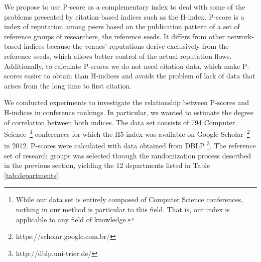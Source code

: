 \documentclass[notitlepage]{svjour3}
\begin{document}
We propose to use P-score as a complementary index to deal with some of the problems
presented by citation-based indices such as the H-index.
P-score is a index of reputation among peers based on the publication pattern of a set of
reference groups of researchers, the reference seeds. It differs from other network-based 
indices because the venues' reputations derive exclusively from the reference seeds, which 
allows better control of the actual reputation flows. Additionally, to calculate P-scores we 
do not need citation data, which make P-scores easier to obtain than H-indices and avoids 
the problem of lack of data that arises from the long time to first citation.

We conducted experiments to investigate the relationship between P-scores and H-indices
in conference rankings. In particular, we wanted to estimate the degree of correlation between both 
indices. The data set consists of 794
Computer Science~\footnote{
While our data set is entirely composed of Computer Science conferences, nothing in our method is
particular to this field. That is, our index is applicable to any field of knowledge.
} 
conferences
for which the H5 index was available on Google Scholar~\footnote{https://scholar.google.com.br/}
in 2012. P-scores were calculated with
data obtained from DBLP \footnote{http://dblp.uni-trier.de/}. The reference set of research groups
was selected through the randomization process described in the previous section, 
yielding the 12 departments listed in Table \ref{tab:departments}.
\end{document}
